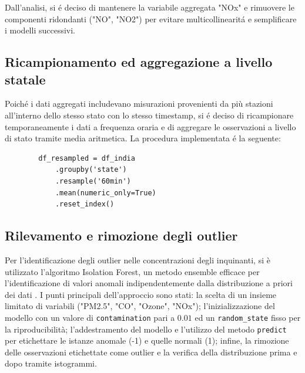 \documentclass[a4paper,12pt]{report}
\begin{document}
	Dall'analisi, si é deciso di mantenere la variabile aggregata "NOx" e rimuovere le componenti ridondanti ("NO", "NO2") per evitare multicollinearitá e semplificare i modelli successivi.
	
	\subsection{Ricampionamento ed aggregazione a livello statale}
	Poiché i dati aggregati includevano misurazioni provenienti da più stazioni all'interno dello stesso stato con lo stesso timestamp, si é deciso di ricampionare temporaneamente i dati a frequenza oraria e di aggregare le osservazioni a livello di stato tramite media aritmetica. La procedura implementata é la seguente:
	
	\begin{verbatim}
		df_resampled = df_india
			.groupby('state')
			.resample('60min')
			.mean(numeric_only=True)
			.reset_index()
	\end{verbatim}
	
	\subsection{Rilevamento e rimozione degli outlier}
	Per l'identificazione degli outlier nelle concentrazioni degli inquinanti, si è utilizzato l'algoritmo Isolation Forest, un metodo ensemble efficace per l'identificazione di valori anomali indipendentemente dalla distribuzione a priori dei dati \cite{liu2009iforest}. I punti principali dell'approccio sono stati: la scelta di un insieme limitato di variabili ("PM2.5", "CO", "Ozone", "NOx"); l'inizializzazione del modello con un valore di \texttt{contamination} pari a $0.01$ ed un \texttt{random\_state} fisso per la riproducibilità; l'addestramento del modello e l'utilizzo del metodo \texttt{predict} per etichettare le istanze anomale (-1) e quelle normali (1); infine, la rimozione delle osservazioni etichettate come outlier e la verifica della distribuzione prima e dopo tramite istogrammi.
	
\end{document}
